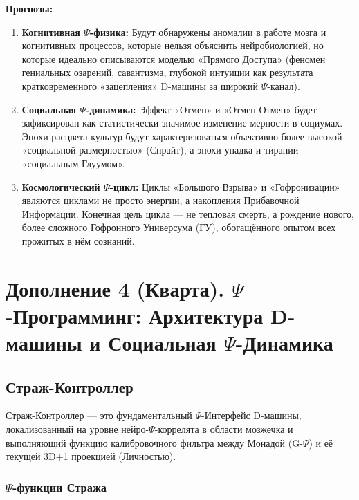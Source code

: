 \documentclass[a4paper,12pt]{article}
\begin{document}
\textbf{Прогнозы:}
\begin{enumerate}
	\item \textbf{Когнитивная $\Psi$-физика:} Будут обнаружены аномалии в работе мозга и когнитивных процессов, которые нельзя объяснить нейробиологией, но которые идеально описываются моделью «Прямого Доступа» (феномен гениальных озарений, савантизма, глубокой интуиции как результата кратковременного «зацепления» D-машины за широкий $\Psi$-канал).
	\item \textbf{Социальная $\Psi$-динамика:} Эффект «Отмен» и «Отмен Отмен» будет зафиксирован как статистически значимое изменение мерности в социумах. Эпохи расцвета культур будут характеризоваться объективно более высокой «социальной размерностью» (Спрайт), а эпохи упадка и тирании — «социальным Глуумом».
	\item \textbf{Космологический $\Psi$-цикл:} Циклы «Большого Взрыва» и «Гофронизации» являются циклами не просто энергии, а накопления Прибавочной Информации. Конечная цель цикла — не тепловая смерть, а рождение нового, более сложного Гофронного Универсума (ГУ), обогащённого опытом всех прожитых в нём сознаний.
\end{enumerate}

\newpage
\section{Дополнение 4 (Кварта). $\Psi$-Программинг: Архитектура D-машины и Социальная $\Psi$-Динамика}

\subsection{Страж-Контроллер}

Страж-Контроллер — это фундаментальный $\Psi$-Интерфейс D-машины, локализованный на уровне нейро-$\Psi$-коррелята в области мозжечка и выполняющий функцию калибровочного фильтра между Монадой (G-$\Psi$) и её текущей 3D+1 проекцией (Личностью).

\subsubsection{$\Psi$-функции Стража}
\end{document}
